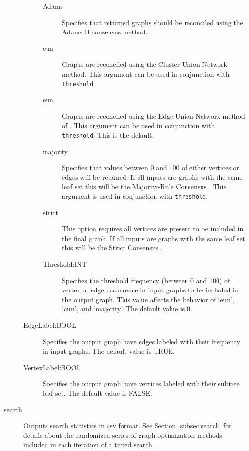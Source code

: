 \begin{description}
\begin{description}
			\begin{description}
			
				\item[Adams] Specifies that returned graphs should be reconciled using the 
				Adams II consensus \citep{Adams1972} method.
				
				\item[cun] Graphs are reconciled using the Cluster Union Network 
				\citep{Baroni2005} method. This argument can be used in conjunction with 
				\texttt{threshold}. 
				
				\item[eun] Graphs are reconciled using the Edge-Union-Network method of 
				\citep{MiyagiandWheeler2019}. This argument can be used in conjunction with 
				\texttt{threshold}. This is the default.
				
				\item[majority] Specifies that values between 0 and 100 of either vertices or 
				edges will be retained. If all inputs are graphs with the same leaf set this will 
				be the Majority-Rule Consensus \citep{MargushandMcMorris1981}. This
				argument is used in conjunction with \texttt{threshold}.

				\item[strict] This option requires all vertices are present to be included in the final 
				graph. If all inputs are graphs with the same leaf set this will be the Strict Consensus 
				\citep{Schuhandpolhemus1980}. 
				
				\item [Threshold:INT] Specifies the threshold frequency (between 0 and 100) 
				of vertex or edge occurrence in input graphs to be included in the output graph. 
				This value affects the behavior of `eun', `cun', and `majority'. The 
				default value is $0$.
				
			\end{description}
		
			\item [EdgeLabel:BOOL] Specifies the output graph have edges 
			labeled with their frequency in input graphs. The default value is TRUE.			
			
			\item [VertexLabel:BOOL] Specifies the output graph have vertices 
			labeled with their subtree leaf set. The default value is FALSE.	
				
		\end{description}	
				
		\item[search] Outputs search statistics in csv format. See Section 
		\ref{subsec:search} for details about the randomized series of graph 
		optimization methods included in each iteration of a timed search.
			

\end{description}
